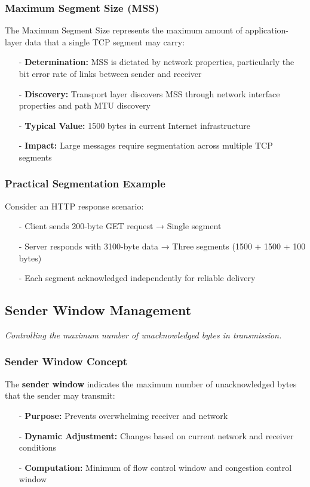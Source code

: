 \documentclass[../../compsys.tex]{subfiles}
\begin{document}
\subsubsection{Maximum Segment Size (MSS)}
The Maximum Segment Size represents the maximum amount of application-layer data that a single TCP segment may carry:

\begin{itemize}
  \item[-] \textbf{Determination:} MSS is dictated by network properties, particularly the bit error rate of links between sender and receiver
  \item[-] \textbf{Discovery:} Transport layer discovers MSS through network interface properties and path MTU discovery
  \item[-] \textbf{Typical Value:} 1500 bytes in current Internet infrastructure
  \item[-] \textbf{Impact:} Large messages require segmentation across multiple TCP segments
\end{itemize}

\subsubsection{Practical Segmentation Example}
Consider an HTTP response scenario:
\begin{itemize}
  \item[-] Client sends 200-byte GET request → Single segment
  \item[-] Server responds with 3100-byte data → Three segments (1500 + 1500 + 100 bytes)
  \item[-] Each segment acknowledged independently for reliable delivery
\end{itemize}

\subsection{Sender Window Management}
\textit{Controlling the maximum number of unacknowledged bytes in transmission.}

\subsubsection{Sender Window Concept}
The \textbf{sender window} indicates the maximum number of unacknowledged bytes that the sender may transmit:

\begin{itemize}
  \item[-] \textbf{Purpose:} Prevents overwhelming receiver and network
  \item[-] \textbf{Dynamic Adjustment:} Changes based on current network and receiver conditions
  \item[-] \textbf{Computation:} Minimum of flow control window and congestion control window
\end{itemize}
\end{document}
